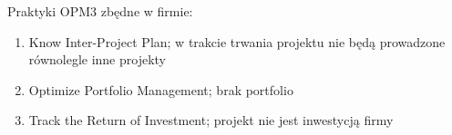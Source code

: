 Praktyki OPM3 zbędne w firmie:

\begin{enumerate}
\item Know Inter-Project Plan; w trakcie trwania projektu nie będą prowadzone równolegle inne projekty
\item Optimize Portfolio Management; brak portfolio
\item Track the Return of Investment; projekt nie jest inwestycją firmy
\end{enumerate}

